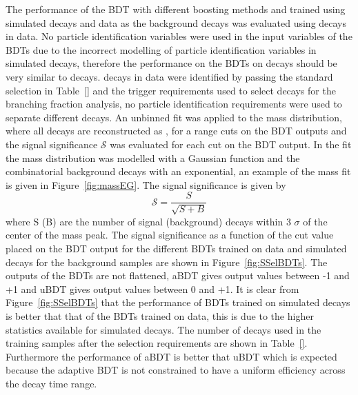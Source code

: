 The performance of the BDT with different boosting methods and trained using simulated decays and data as the background decays was evaluated using \bhh decays in data. No particle identification variables were used in the input variables of the BDTs due to the incorrect modelling of particle identification variables in simulated decays, therefore the performance on the BDTs on \bhh decays should be very similar to \bsmumu decays. \bhh decays in data were identified by passing the standard \bhh selection in Table~\ref{} and the trigger requirements used to select \bsmumu decays for the branching fraction analysis, no particle identification requirements were used to separate different \bhh decays. An unbinned \ml fit was applied to the \bhh mass distribution, where all \bhh decays are reconstructed as \bsmumu, for a range cuts on the BDT outputs and the signal significance $\mathcal{S}$  was evaluated for each cut on the BDT output. In the \ml fit the \bhh mass distribution was modelled with a Gaussian function and the combinatorial background decays with an exponential, an example of the mass fit is given in Figure~\ref{fig:massEG}. The signal significance is given by
\begin{equation}
\mathcal{S} = \frac{S}{\sqrt{S+B}}
\label{eq:SigSigf}
\end{equation} 
where S (B) are the number of signal (background) decays within 3 $\sigma$ of the center of the \bhh mass peak. 
The signal significance as a function of the cut value placed on the BDT output for the different BDTs trained on data and simulated decays for the background samples are shown in Figure~\ref{fig:SSelBDTs}. The outputs of the BDTs are not flattened, aBDT gives output values between -1 and +1 and uBDT gives output values between 0 and +1. It is clear from Figure~\ref{fig:SSelBDTs} that the performance of BDTs trained on simulated decays is better that that of the BDTs trained on data, this is due to the higher statistics available for simulated decays. The number of decays used in the training samples after the selection requirements are shown in Table~\ref{}. Furthermore the performance of aBDT is better that uBDT which is expected because the adaptive BDT is not constrained to have a uniform efficiency across the decay time range. 
